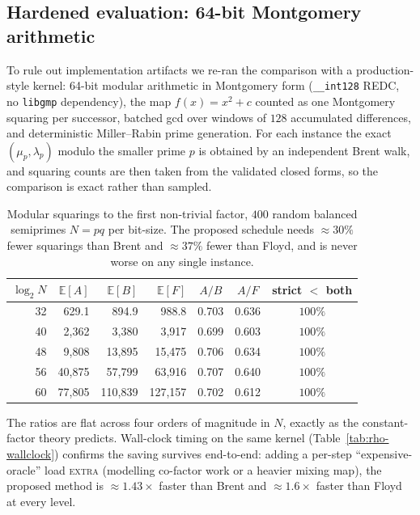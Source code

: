 \documentclass[11pt]{article}
\begin{document}
\subsection{Hardened evaluation: 64-bit Montgomery arithmetic}
\label{sec:rho-hardened}

To rule out implementation artifacts we re-ran the comparison with a
production-style kernel: 64-bit modular arithmetic in Montgomery form
(\texttt{\_\_int128} REDC, no \texttt{libgmp} dependency), the map $f(x)=x^2+c$
counted as one Montgomery squaring per successor, batched gcd over windows of
$128$ accumulated differences, and deterministic Miller--Rabin prime generation.
For each instance the exact $(\mu_p,\lambda_p)$ modulo the smaller prime $p$ is
obtained by an independent Brent walk, and squaring counts are then taken from the
validated closed forms, so the comparison is exact rather than sampled.

\begin{table}[H]\centering
\caption{Modular squarings to the first non-trivial factor, $400$ random balanced
semiprimes $N=pq$ per bit-size. The proposed schedule needs $\approx30\%$ fewer
squarings than Brent and $\approx37\%$ fewer than Floyd, and is never worse on any
single instance.}
\label{tab:rho-hardened}
\begin{tabular}{rrrrccc}
\toprule
$\log_2 N$ & $\mathbb E[A]$ & $\mathbb E[B]$ & $\mathbb E[F]$ & $A/B$ & $A/F$ & strict $<$ both\\
\midrule
32 & 629.1 & 894.9 & 988.8 & 0.703 & 0.636 & $100\%$\\
40 & 2{,}362 & 3{,}380 & 3{,}917 & 0.699 & 0.603 & $100\%$\\
48 & 9{,}808 & 13{,}895 & 15{,}475 & 0.706 & 0.634 & $100\%$\\
56 & 40{,}875 & 57{,}799 & 63{,}916 & 0.707 & 0.640 & $100\%$\\
60 & 77{,}805 & 110{,}839 & 127{,}157 & 0.702 & 0.612 & $100\%$\\
\bottomrule
\end{tabular}
\end{table}

The ratios are flat across four orders of magnitude in $N$, exactly as the
constant-factor theory predicts. Wall-clock timing on the same kernel
(Table~\ref{tab:rho-wallclock}) confirms the saving survives end-to-end: adding a
per-step ``expensive-oracle'' load \textsc{extra} (modelling co-factor work or a
heavier mixing map), the proposed method is $\approx1.43\times$ faster than Brent
and $\approx1.6\times$ faster than Floyd at every level.
\end{document}
